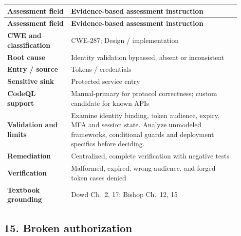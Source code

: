 \documentclass[11pt,letterpaper,oneside]{book}
\begin{document}
\small
\setlength{\tabcolsep}{2pt}
\renewcommand{\arraystretch}{1.18}
\begin{longtable}{>{\raggedright\arraybackslash}p{0.26\linewidth}>{\raggedright\arraybackslash}p{0.69\linewidth}}
\toprule
\textbf{Assessment field} & \textbf{Evidence-based assessment instruction}\\
\midrule
\endfirsthead
\toprule
\textbf{Assessment field} & \textbf{Evidence-based assessment instruction}\\
\midrule
\endhead
\textbf{CWE and classification} & CWE-287; Design / implementation\\
\textbf{Root cause} & Identity validation bypassed, absent or inconsistent\\
\textbf{Entry / source} & Tokens / credentials\\
\textbf{Sensitive sink} & Protected service entry\\
\textbf{CodeQL support} & Manual-primary for protocol correctness; custom candidate for known APIs\\
\textbf{Validation and limits} & Examine identity binding, token audience, expiry, MFA and session state. Analyze unmodeled frameworks, conditional guards and deployment specifics before deciding.\\
\textbf{Remediation} & Centralized, complete verification with negative tests\\
\textbf{Verification} & Malformed, expired, wrong-audience, and forged token cases denied\\
\textbf{Textbook grounding} & Dowd Ch.~2, 17; Bishop Ch.~12, 15\\
\bottomrule
\end{longtable}
\normalsize

\subsection{15. Broken authorization}
\end{document}

